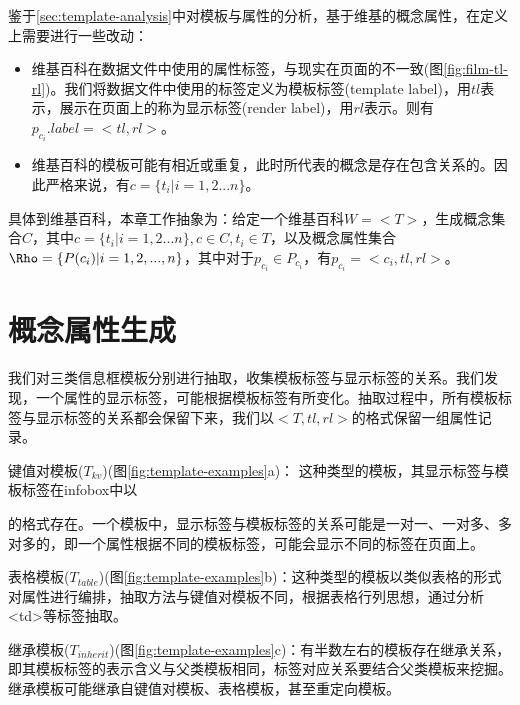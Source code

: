 鉴于\ref{sec:template-analysis}中对模板与属性的分析，基于维基的概念属性，在定义上需要进行一些改动：
\begin{itemize}
\item 维基百科在数据文件中使用的属性标签，与现实在页面的不一致(图\ref{fig:film-tl-rl})。我们将数据文件中使用的标签定义为模板标签(template label)，用$tl$表示，展示在页面上的称为显示标签(render label)，用$rl$表示。则有$p_{c_i}.label = <tl, rl>$。
\item 维基百科的模板可能有相近或重复，此时所代表的概念是存在包含关系的。因此严格来说，有$c = \{t_i|i=1,2...n\}$。
\end{itemize}

具体到维基百科，本章工作抽象为：给定一个维基百科$W = <T>$，生成概念集合$C$，其中$c = \{t_i|i=1,2...n\}, c \in C, t_i \in T$，以及概念属性集合$\Rho = \{P(c_i)| i = 1,2,...,n\}$，其中对于$p_{c_i} \in P_{c_i}$，有$p_{c_i} = <c_i, tl, rl>$。

\section{概念属性生成}
\label{sec:property-extraction}

我们对三类信息框模板分别进行抽取，收集模板标签与显示标签的关系。我们发现，一个属性的显示标签，可能根据模板标签有所变化。抽取过程中，所有模板标签与显示标签的关系都会保留下来，我们以$<T, tl, rl>$的格式保留一组属性记录。

{\heiti 键值对模板($T_{kv}$)(图\ref{fig:template-examples}a)：} 这种类型的模板，其显示标签与模板标签在infobox中以

\begin{figure*}[ht]
\begin{center}
\end{center}
\end{figure*}

的格式存在。一个模板中，显示标签与模板标签的关系可能是一对一、一对多、多对多的，即一个属性根据不同的模板标签，可能会显示不同的标签在页面上。

{\heiti 表格模板($T_{table}$)(图\ref{fig:template-examples}b)：}这种类型的模板以类似表格的形式对属性进行编排，抽取方法与键值对模板不同，根据表格行列思想，通过分析<td>等标签抽取。

{\heiti 继承模板($T_{inherit}$)(图\ref{fig:template-examples}c)：}有半数左右的模板存在继承关系，即其模板标签的表示含义与父类模板相同，标签对应关系要结合父类模板来挖掘。继承模板可能继承自键值对模板、表格模板，甚至重定向模板。

